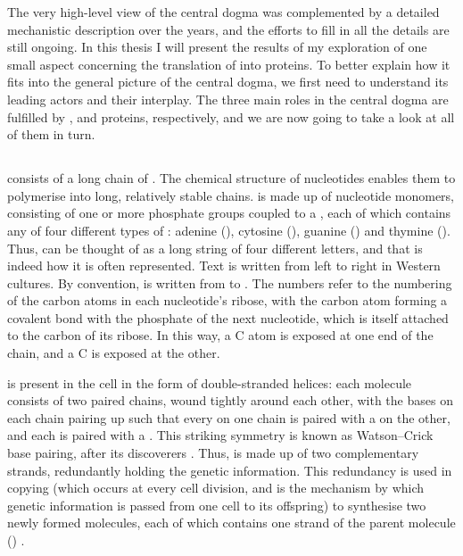 The very high-level view of the central dogma was complemented by a detailed
mechanistic description over the years, and the efforts to fill in all the
details are still ongoing. In this thesis I will present the results of my
exploration of one small aspect concerning the translation of \rna into
proteins. To better explain how it fits into the general picture of the central
dogma, we first need to understand its leading actors and their interplay. The
three main roles in the central dogma are fulfilled by \dna, \rna and proteins,
respectively, and we are now going to take a look at all of them in turn.

\subsection{}

\dna consists of a long chain of .
The chemical structure of nucleotides enables them to polymerise into long,
relatively stable chains. \dna is made up of nucleotide monomers, consisting of
one or more phosphate groups coupled to a , each of which contains any of four
different types of : adenine (\nA), cytosine (\nC), guanine
(\nG) and thymine (\nT). Thus, \dna can be thought of as a long string of four
different letters, and that is indeed how it is often represented. Text is
written from left to right in Western cultures. By convention, \dna is written
from \fivep to \threep. The numbers refer to the numbering of the carbon atoms
in each nucleotide’s ribose, with the \threep carbon atom forming a covalent
bond with the phosphate of the next nucleotide, which is itself attached to the
\fivep carbon of its ribose. In this way, a \fivep \ce C atom is exposed at one
end of the chain, and a \threep \ce C is exposed at the other.

\dna is present in the cell in the form of double-stranded helices: each \dna
molecule consists of two paired chains, wound tightly around each other, with
the bases on each chain pairing up such that every \nA on one chain is paired
with a \nT on the other, and each \nC is paired with a \nG. This striking
symmetry is known as Watson–Crick base pairing, after its discoverers
\citep{Watson:1953}. Thus, \dna is made up of two complementary strands,
redundantly holding the genetic information. This redundancy is used in \dna
copying (which occurs at every cell division, and is the mechanism by which
genetic information is passed from one cell to its offspring) to synthesise two
newly formed \dna molecules, each of which contains one strand of the parent
\dna molecule () \citep{Meselson:1958}.

